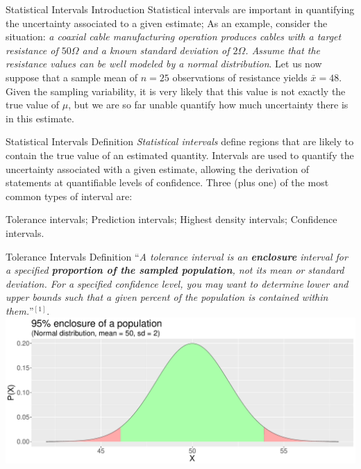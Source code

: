 \documentclass[t]{beamer}
\begin{document}

\begin{ftst}
{Statistical Intervals}
{Introduction}
Statistical intervals are important in quantifying the uncertainty associated to a given estimate;
\vone
As an example, consider the situation: \textit{a coaxial cable manufacturing operation produces cables with a target resistance of $50\Omega$ and a known standard deviation of $2\Omega$. Assume that the resistance values can be well modeled by a normal distribution}.
\vone
Let us now suppose that a sample mean of $n=25$ observations of resistance  yields $\bar{x} = 48$. Given the sampling variability, it is very likely that this value is not exactly the true value of $\mu$, but we are so far unable quantify how much uncertainty there is in this estimate.
\end{ftst}


\begin{ftst}
{Statistical Intervals}
{Definition}
\textit{Statistical intervals} define regions that are likely to contain the true value of an estimated quantity. 
\vone
Intervals are used to quantify the uncertainty associated with a given estimate, allowing the derivation of statements at quantifiable levels of confidence.
\vone
Three (plus one) of the most common types of interval are:

\bitems Tolerance intervals;
	\spitem Prediction intervals;
	\spitem Highest density intervals;
	\spitem Confidence intervals.
\eitem
\end{ftst}



\begin{ftst}
{Tolerance Intervals}
{Definition}
``{\small\textit{A tolerance interval is an \textbf{enclosure} interval for a specified \textbf{proportion of the sampled population}, not its mean or standard deviation. For a specified confidence level, you may want to determine lower and upper bounds such that a given percent of the population is contained within them.}}''$^{[1]}$.
\vone
\centering\includegraphics[width=\textwidth]{../figs/enclosure.pdf}
\end{ftst}
\end{document}
